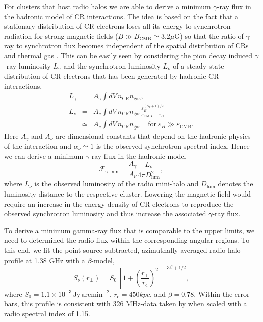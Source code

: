 \documentclass[12pt,manuscript]{aastex}
\newcommand{\rmn}{\mathrm}
\newcommand{\CR}{\mathrm{CR}}
\newcommand{\dps}{\displaystyle}
\newcommand{\eps}{\varepsilon}
\begin{document}
For clusters that host radio halos we are able to derive a minimum $\gamma$-ray
flux in the hadronic model of CR interactions. The idea is based on the fact
that a stationary distribution of CR electrons loses all its energy to
synchrotron radiation for strong magnetic fields ($B \gg B_\rmn{CMB} \simeq 3.2
\mu$G) so that the ratio of $\gamma$-ray to synchrotron flux becomes independent
of the spatial distribution of CRs and thermal gas \citep{article:Pfrommer:2008}.
This can be easily seen by considering the pion decay induced $\gamma$-ray
luminosity $L_\gamma$ and the synchrotron luminosity $L_\nu$ of a steady state
distribution of CR electrons that has been generated by hadronic CR
interactions,
\begin{eqnarray}
L_\gamma &=& A_\gamma \dps\int d V\, n_\CR n_\rmn{gas},\\
\label{eq:Lnu}
   L_\nu &=& A_\nu \dps\int d V\, n_\CR n_\rmn{gas} \frac{\dps
    \eps_B^{(\alpha_\nu+1)/2}}{\dps\eps_\rmn{CMB}+\eps_B}\\
  &\simeq&A_\nu \dps\int d V\, n_\CR n_\rmn{gas}\quad\rmn{for}~\eps_B \gg \eps_\rmn{CMB}.
\end{eqnarray}
Here $A_\gamma$ and $A_\nu$ are dimensional constants that depend on the
hadronic physics of the interaction \citep{article:PfrommerEnsslinSpringel:2008,
  article:Pfrommer:2008} and $\alpha_\nu\simeq 1$ is the observed synchrotron
spectral index. Hence we can derive a minimum $\gamma$-ray flux in the hadronic
model
\begin{equation}
  \label{eq:Fmin}
  \mathcal{F}_{\gamma,\rmn{min}} = 
  \frac{\dps A_\gamma}{\dps A_\nu}\frac{\dps L_\nu}{\dps 4\pi D_\rmn{lum}^2},
\end{equation}
where $L_\nu$ is the observed luminosity of the radio mini-halo and
$D_\rmn{lum}$ denotes the luminosity distance to the respective cluster.
Lowering the magnetic field would require an increase in the energy density of
CR electrons to reproduce the observed synchrotron luminosity and thus increase
the associated $\gamma$-ray flux. 

To derive a minimum gamma-ray flux that is comparable to the upper limits, we
need to determined the radio flux within the corresponding angular regions. To
this end, we fit the point source subtracted, azimuthally averaged radio halo
profile at 1.38 GHz \citep{article:Deiss_etal:1997} with a $\beta$-model,
\begin{equation}
S_\nu (r_\bot)= S_0\, 
\left[ 1 + \left( \frac{r_\bot}{r_{\rmn{c}}}\right)^2\right]
^{-3\beta + 1/2},
\label{beta}
\end{equation}
where $S_0 = 1.1 \times 10^{-3}\,\rmn{Jy\,arcmin}^{-2}$, $r_{\rmn{c}} = 450
kpc$, and $\beta = 0.78$.  Within the error bars, this profile is consistent
with 326 MHz-data taken by \citet{article:Govoni_etal:2001} when scaled with a radio
spectral index of 1.15. 
\end{document}
